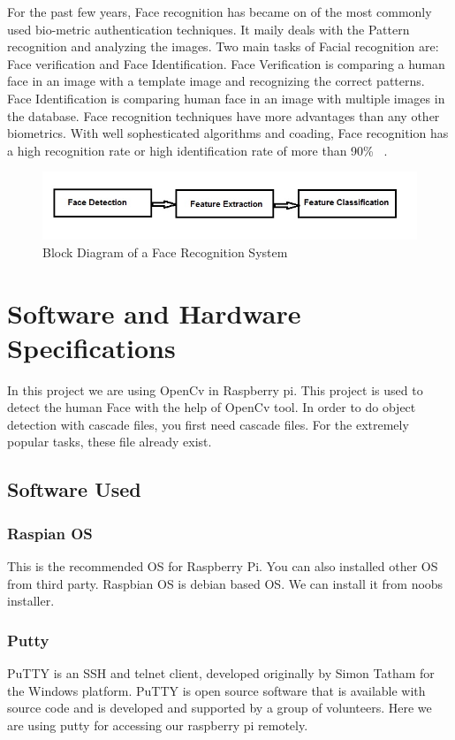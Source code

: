 \documentclass[sigconf]{acmart}
\begin{document}
For the past few years, Face recognition has became on of the most commonly used bio-metric authentication techniques. It maily deals with the Pattern recognition and analyzing the images. Two main tasks of Facial recognition are: Face verification and Face Identification. Face Verification is comparing a human face in an image with a template image and recognizing the correct patterns. Face Identification is comparing human face in an image with multiple images in the database. Face recognition techniques have more advantages than any other biometrics. With well sophesticated algorithms and coading, Face recognition has a high recognition rate or high identification rate of more than 90\% ~\cite{Riddhi2013}. 

\begin{figure}[ht!]
  \includegraphics[width=\columnwidth]{images/Face-recognition.jpg}
  \caption{Block Diagram of a Face Recognition System}
\end{figure}


\section{Software and Hardware Specifications}
In this project we are using OpenCv in Raspberry pi. This project is used to detect the human Face with the help of OpenCv tool. In order to do object detection with cascade files, you first need cascade files. For the extremely popular tasks, these file already exist.

\subsection{Software Used}

\subsubsection{Raspian OS}
This is the recommended OS for Raspberry Pi. You can also installed other OS from third party. Raspbian OS is debian based OS. We can install it from noobs installer. 
\subsubsection{Putty}
PuTTY is an SSH and telnet client, developed originally by Simon Tatham for the Windows platform. PuTTY is open source software that is available with source code and is developed and supported by a group of volunteers. Here we are using putty for accessing our raspberry pi remotely.
\end{document}
